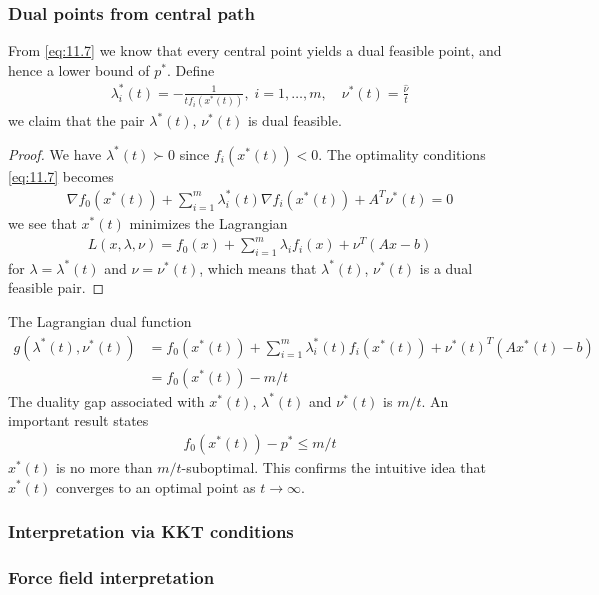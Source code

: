 \subsubsection{Dual points from central path}
From \eqref{eq:11.7} we know that every central point yields a dual feasible point, and hence a lower bound of $p^\ast$.
Define
\begin{align}
  \lambda_i^\ast(t)=-\frac{1}{tf_i(x^\ast(t))},\;i=1,\dots,m,\quad\nu^\ast(t)=\frac{\hat{\nu}}{t}\label{eq:11.10}
\end{align}
we claim that the pair $\lambda^\ast(t)$, $\nu^\ast(t)$ is dual feasible.
\begin{proof}
  We have $\lambda^\ast(t)\succ 0$ since $f_i(x^\ast(t))<0$.
  The optimality conditions \eqref{eq:11.7} becomes
  \begin{align*}
    \nabla f_0(x^\ast(t))+\sum_{i=1}^m\lambda_i^\ast(t)\nabla f_i(x^\ast(t))+A^T\nu^\ast(t)=0
  \end{align*}
  we see that $x^\ast(t)$ minimizes the Lagrangian
  \begin{align*}
    L(x,\lambda,\nu)=f_0(x)+\sum_{i=1}^m\lambda_if_i(x)+\nu^T(Ax-b)
  \end{align*}
  for $\lambda=\lambda^\ast(t)$ and $\nu=\nu^\ast(t)$, which means that $\lambda^\ast(t)$, $\nu^\ast(t)$ is a dual feasible pair.
\end{proof}
The Lagrangian dual function
\begin{align*}
  g(\lambda^\ast(t),\nu^\ast(t))
    &= f_0(x^\ast(t))+\sum_{i=1}^m\lambda_i^\ast(t)f_i(x^\ast(t))+\nu^\ast(t)^T(Ax^\ast(t)-b)\\
    &= f_0(x^\ast(t))-m/t
\end{align*}
The duality gap associated with $x^\ast(t)$, $\lambda^\ast(t)$ and $\nu^\ast(t)$ is $m/t$.
An important result states
\begin{align*}
  f_0(x^\ast(t))-p^\ast\le m/t
\end{align*}
\ie $x^\ast(t)$ is no more than $m/t$-suboptimal.
This confirms the intuitive idea that $x^\ast(t)$ converges to an optimal point as $t\rightarrow\infty$.

\subsubsection{Interpretation via KKT conditions}

\subsubsection{Force field interpretation}

